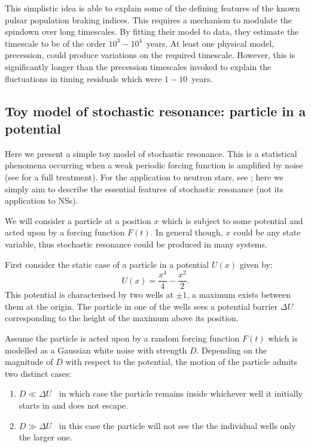This simplistic idea is able to explain some of the defining features of the
known pulsar population braking indices. This requires a mechanism to modulate
the spindown over long timescales. By fitting their model to data, they
estimate the timescale to be of the order $10^{3}-10^{4}$~years. At least one
physical model, precession, could produce variations on the required timescale.
However, this is significantly longer than the precession timescales invoked to
explain the fluctuations in timing residuals which were $1-10$~years.
\begin{subappendices}
\subsection{Toy model of stochastic resonance: particle in a potential}
\label{App: Stochastic}

Here we present a simple toy model of stochastic resonance. This is a
statistical phenomena occurring when a weak periodic forcing function is
amplified by noise (see \citet{Jung1991} for a full treatment).  For the
application to neutron stars, see \citet{Cordes2013}; here we simply aim to
describe the essential features of stochastic resonance (not its application to
NSs). 

We will consider a particle at a position $x$ which is subject to some
potential and acted upon by a forcing function $F(t)$. In general though, $x$
could be any state variable, thus stochastic resonance could be produced
in many systems.

First consider the static case of a particle in a potential $U(x)$  given by:
\begin{equation}
    U(x) = \frac{x^{4}}{4}-\frac{x^{2}}{2}. 
\end{equation}
This potential is characterised by two wells at $\pm1$, a maximum exists
between them at the origin. The particle in one of the wells sees a potential
barrier $\Delta U$ corresponding to the height of the maximum above its
position.

Assume the particle is acted upon by a random forcing function $F(t)$ which is
modelled as a Gaussian white noise with strength $D$. Depending on the
magnitude of $D$ with respect to the potential, the motion of the particle
admits two distinct cases:
\begin{enumerate}
\item $D \ll \Delta U \;\;$ in which case the particle remains inside whichever
    well it initially starts in and does not escape.
\item $D \gg \Delta U \;\;$ in this case the particle will not see the the
    individual wells only the larger one.
\end{enumerate}


\end{subappendices}

